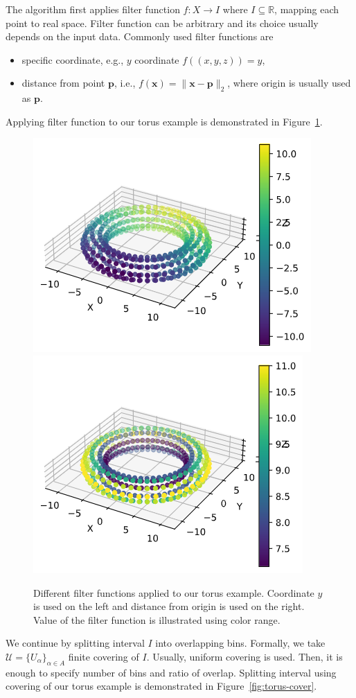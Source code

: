 \documentclass{article}
\begin{document}
The algorithm first applies filter function $f: X \to I$ where $I \subseteq \mathbb{R}$, mapping each point to real space.
Filter function can be arbitrary and its choice usually depends on the input data.
Commonly used filter functions are
\begin{itemize}
    \item specific coordinate, e.g., $y$ coordinate $f((x, y, z)) = y$,
    \item distance from point $\mathbf{p}$, i.e., $f(\mathbf{x}) = \lVert \mathbf{x} - \mathbf{p} \rVert_2$, where origin is usually used as $\mathbf{p}$.
\end{itemize}
Applying filter function to our torus example is demonstrated in Figure~\ref{fig:torus-filter}.

\begin{figure}[ht]
    \centering
    \includegraphics[width=0.4\columnwidth]{torus-y-coor}
    \includegraphics[width=0.4\columnwidth]{torus-distance-from-origin}
    \caption{Different filter functions applied to our torus example.
        Coordinate $y$ is used on the left and distance from origin is used on the right.
        Value of the filter function is illustrated using color range.}
    \label{fig:torus-filter}
\end{figure}

We continue by splitting interval $I$ into overlapping bins.
Formally, we take $\mathcal{U} = \{ U_\alpha \}_{\alpha \in A}$ finite covering of $I$.
Usually, uniform covering is used.
Then, it is enough to specify number of bins and ratio of overlap.
Splitting interval using covering of our torus example is demonstrated in Figure~\ref{fig:torus-cover}.
\end{document}
